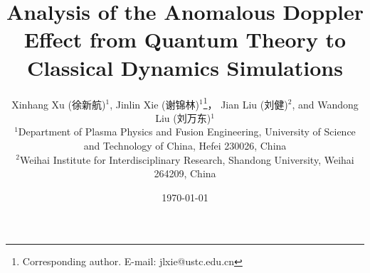 \documentclass{cpbtex3}
\begin{document}
\title{Analysis of the Anomalous Doppler Effect from Quantum Theory to Classical Dynamics Simulations}



\author{
Xinhang Xu (徐新航)$^{1}$, 
Jinlin Xie (谢锦林)$^{1}$\thanks{Corresponding author. E-mail: jlxie@ustc.edu.cn}，
Jian Liu (刘健)$^{2}$, 
and Wandong Liu (刘万东)$^{1}$\\
$^{1}$Department of Plasma Physics and Fusion Engineering, University of Science and Technology of China, Hefei 230026, China \\
$^{2}$Weihai Institute for Interdisciplinary Research, Shandong University, Weihai 264209, China
}

\date{\today}
\maketitle
\end{document}
